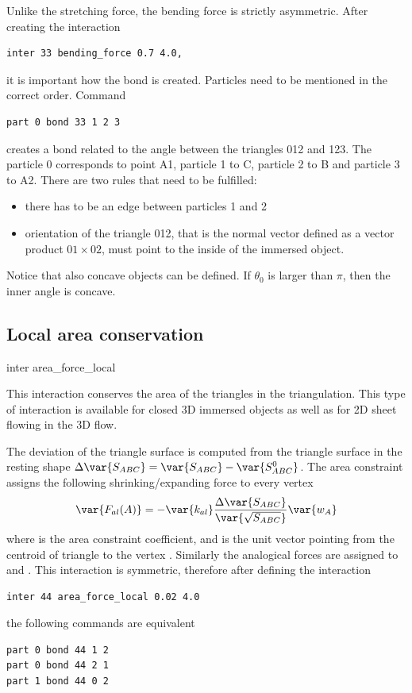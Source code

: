 Unlike the stretching force, the bending force is strictly asymmetric. After 
creating the interaction
\begin{verbatim} 
inter 33 bending_force 0.7 4.0,
\end{verbatim}
it is important how the bond is created. Particles need to be mentioned in the 
correct order. Command
\begin{verbatim} 
part 0 bond 33 1 2 3
\end{verbatim}
creates a bond related to the angle between the triangles 012 and 123. The particle 
0 corresponds to point A1, particle 1 to C, particle 2 to B and particle 3 to A2. 
There are two rules that need to be fulfilled:
\begin{itemize}
\item there has to be an edge between particles 1 and 2
\item orientation of the triangle 012, that is the normal vector 
defined as a vector product $01 \times 02$, must point to the inside of the immersed 
object.
\end{itemize}
Notice that also concave objects can be defined. If $\theta_0$ is larger than $\pi$, 
then the inner angle is concave.

\subsection{Local area conservation}

\begin{essyntax}
  inter 
  area_force_local
   
\end{essyntax}
This interaction conserves the area of the triangles in the triangulation. This 
type of interaction is available for closed 3D immersed objects as well as for 2D 
sheet flowing in the 3D flow.

The deviation of the triangle surface  is computed from the triangle 
surface in the resting shape $\Delta \var{S_{ABC}} = \var{S_{ABC}} - \var{S_{ABC}^0}$. 
The area constraint assigns the following shrinking/expanding force to every vertex 
\begin{equation}
 \var{F_{al}(A)} = -\var{k_{al}}\frac{\Delta \var{S_{ABC}}}{\var{\sqrt{S_{ABC}}}}\var{w_{A}}
\end{equation}
where   is the area constraint coefficient, and  is the unit 
vector pointing from the centroid of triangle  to the vertex . 
Similarly the analogical forces are assigned to  and . This interaction 
is symmetric, therefore after defining the interaction
\begin{verbatim} 
inter 44 area_force_local 0.02 4.0
\end{verbatim}
the following commands are equivalent
\begin{verbatim} 
part 0 bond 44 1 2
part 0 bond 44 2 1
part 1 bond 44 0 2
\end{verbatim}

